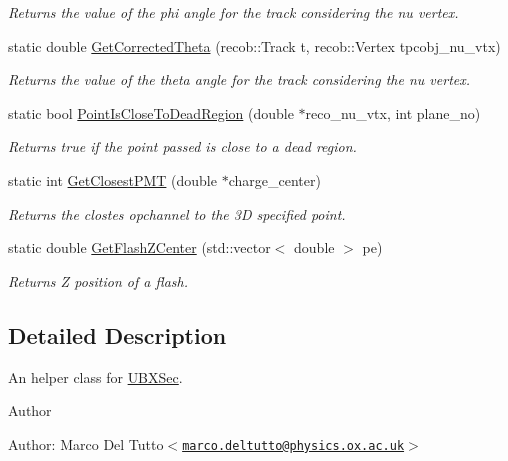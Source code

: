 \begin{DoxyCompactItemize}
\begin{DoxyCompactList}\small\item\em \-Returns the value of the phi angle for the track considering the nu vertex. \end{DoxyCompactList}\item 
static double \hyperlink{classUBXSecHelper_a994f8158cb00b028048af055c487bd9d}{\-Get\-Corrected\-Theta} (recob\-::\-Track t, recob\-::\-Vertex tpcobj\-\_\-nu\-\_\-vtx)
\begin{DoxyCompactList}\small\item\em \-Returns the value of the theta angle for the track considering the nu vertex. \end{DoxyCompactList}\item 
static bool \hyperlink{classUBXSecHelper_a7df598dfbdfdb620737fd69297e67faf}{\-Point\-Is\-Close\-To\-Dead\-Region} (double $\ast$reco\-\_\-nu\-\_\-vtx, int plane\-\_\-no)
\begin{DoxyCompactList}\small\item\em \-Returns true if the point passed is close to a dead region. \end{DoxyCompactList}\item 
static int \hyperlink{classUBXSecHelper_a88533a5a59d61351437a1fe2e54aff25}{\-Get\-Closest\-P\-M\-T} (double $\ast$charge\-\_\-center)
\begin{DoxyCompactList}\small\item\em \-Returns the clostes opchannel to the 3\-D specified point. \end{DoxyCompactList}\item 
static double \hyperlink{classUBXSecHelper_a3fd25ef568b54aded55d6c1b6a8593fa}{\-Get\-Flash\-Z\-Center} (std\-::vector$<$ double $>$ pe)
\begin{DoxyCompactList}\small\item\em \-Returns \-Z position of a flash. \end{DoxyCompactList}\end{DoxyCompactItemize}


\subsection{\-Detailed \-Description}
\-An helper class for \hyperlink{classUBXSec}{\-U\-B\-X\-Sec}. 

\begin{DoxyAuthor}{\-Author}

\end{DoxyAuthor}
\begin{DoxyParagraph}{\-Author\-:}
\-Marco \-Del \-Tutto$<$\href{mailto:marco.deltutto@physics.ox.ac.uk}{\tt marco.\-deltutto@physics.\-ox.\-ac.\-uk}$>$ 
\end{DoxyParagraph}


